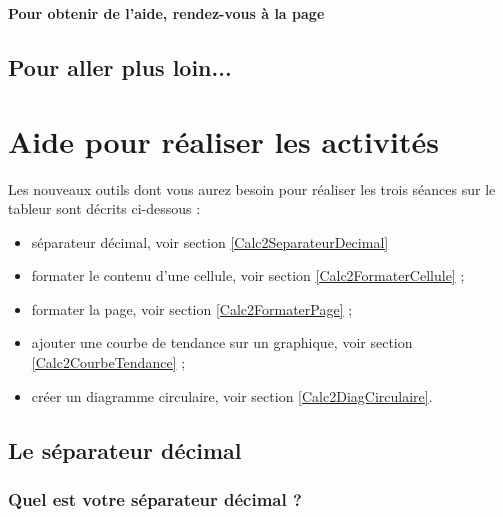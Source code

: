 \textbf{Pour obtenir de l'aide, rendez-vous à la page \pageref{Tableur5eOutils}}



\subsection{Pour aller plus loin...}

\vfill
\phantom{rien}


\newpage

\section{Aide pour réaliser les activités}\label{Tableur5eOutils}
 
Les nouveaux outils dont vous aurez besoin pour réaliser les trois séances sur le tableur sont décrits ci-dessous :

\begin{itemize}  
\item séparateur décimal, voir section \vref{Calc2SeparateurDecimal}  
\item formater le contenu d'une cellule, voir section \vref{Calc2FormaterCellule} ;
\item formater la page, voir section \vref{Calc2FormaterPage} ;
\item ajouter une courbe de tendance sur un graphique, voir section \vref{Calc2CourbeTendance} ;
\item créer un diagramme circulaire, voir section \vref{Calc2DiagCirculaire}.
\end{itemize}  

\subsection{Le séparateur décimal}\label{Calc2SeparateurDecimal}



\subsubsection{Quel est votre séparateur décimal ?}


